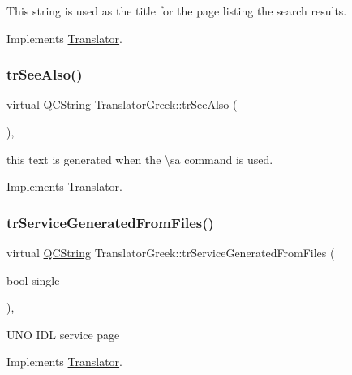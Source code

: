 This string is used as the title for the page listing the search results. 

Implements \mbox{\hyperlink{class_translator}{Translator}}.

\mbox{\label{class_translator_greek_a37a05671b56d7f57078890b9958bbdbe}} 
\subsubsection{\texorpdfstring{trSeeAlso()}{trSeeAlso()}}
{\footnotesize\ttfamily virtual \mbox{\hyperlink{class_q_c_string}{Q\+C\+String}} Translator\+Greek\+::tr\+See\+Also (\begin{DoxyParamCaption}{ }\end{DoxyParamCaption})\hspace{0.3cm}{\ttfamily [inline]}, {\ttfamily [virtual]}}

this text is generated when the \textbackslash{}sa command is used. 

Implements \mbox{\hyperlink{class_translator}{Translator}}.

\mbox{\label{class_translator_greek_a3a57af3347ef4189a44f2dac550ec968}} 
\subsubsection{\texorpdfstring{trServiceGeneratedFromFiles()}{trServiceGeneratedFromFiles()}}
{\footnotesize\ttfamily virtual \mbox{\hyperlink{class_q_c_string}{Q\+C\+String}} Translator\+Greek\+::tr\+Service\+Generated\+From\+Files (\begin{DoxyParamCaption}\item[{bool}]{single }\end{DoxyParamCaption})\hspace{0.3cm}{\ttfamily [inline]}, {\ttfamily [virtual]}}

U\+NO I\+DL service page 

Implements \mbox{\hyperlink{class_translator}{Translator}}.

\mbox{\label{class_translator_greek_ad6a00870dc86a1074d9fc0840affd061}} 
